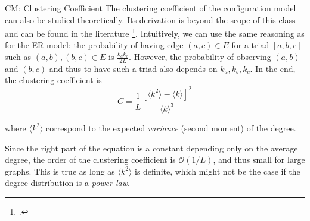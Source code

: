 \documentclass[a4paper,11pt]{book}
\begin{document}
\begin{textbox}{CM: Clustering Coefficient}
The clustering coefficient of the configuration model can also be studied theoretically. Its derivation is beyond the scope of this class and can be found in the literature \footcite{newman2018networks}. Intuitively, we can use the same reasoning as for the ER model: the probability of having edge $(a,c) \in E$ for a triad $[a,b,c]$ such as $(a,b),(b,c) \in E$ is $\frac{k_a k_c}{2L}$. However, the probability of observing $(a,b)$ and $(b,c)$ and thus to have such a triad also depends on $k_a,k_b,k_c$. In the end, the clustering coefficient is
\[
C = \frac{1}{L}\frac{[\langle k^2 \rangle-\langle k \rangle]^2}{\langle k \rangle^3}
\]

where $\langle k^2 \rangle$ correspond to the expected \textit{variance} (second moment) of the degree.

Since the right part of the equation is a constant depending only on the average degree, the order of the clustering coefficient is $\mathcal{O}(1/L)$, and thus small for large graphs. This is true as long as $\langle k^2 \rangle$ is definite, which might not be the case if the degree distribution is a \textit{power law}.
\end{textbox}
\end{document}
